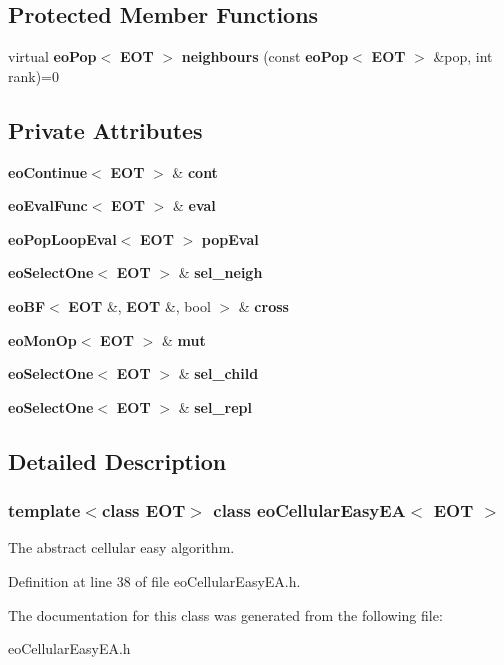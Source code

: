 \subsection*{Protected Member Functions}
\begin{CompactItemize}
\item 
virtual {\bf eo\-Pop}$<$ {\bf EOT} $>$ {\bf neighbours} (const {\bf eo\-Pop}$<$ {\bf EOT} $>$ \&pop, int rank)=0\label{classeo_cellular_easy_e_a_b0}

\end{CompactItemize}
\subsection*{Private Attributes}
\begin{CompactItemize}
\item 
{\bf eo\-Continue}$<$ {\bf EOT} $>$ \& {\bf cont}\label{classeo_cellular_easy_e_a_r0}

\item 
{\bf eo\-Eval\-Func}$<$ {\bf EOT} $>$ \& {\bf eval}\label{classeo_cellular_easy_e_a_r1}

\item 
{\bf eo\-Pop\-Loop\-Eval}$<$ {\bf EOT} $>$ {\bf pop\-Eval}\label{classeo_cellular_easy_e_a_r2}

\item 
{\bf eo\-Select\-One}$<$ {\bf EOT} $>$ \& {\bf sel\_\-neigh}\label{classeo_cellular_easy_e_a_r3}

\item 
{\bf eo\-BF}$<$ {\bf EOT} \&, {\bf EOT} \&, bool $>$ \& {\bf cross}\label{classeo_cellular_easy_e_a_r4}

\item 
{\bf eo\-Mon\-Op}$<$ {\bf EOT} $>$ \& {\bf mut}\label{classeo_cellular_easy_e_a_r5}

\item 
{\bf eo\-Select\-One}$<$ {\bf EOT} $>$ \& {\bf sel\_\-child}\label{classeo_cellular_easy_e_a_r6}

\item 
{\bf eo\-Select\-One}$<$ {\bf EOT} $>$ \& {\bf sel\_\-repl}\label{classeo_cellular_easy_e_a_r7}

\end{CompactItemize}


\subsection{Detailed Description}
\subsubsection*{template$<$class EOT$>$ class eo\-Cellular\-Easy\-EA$<$ EOT $>$}

The abstract cellular easy algorithm. 



Definition at line 38 of file eo\-Cellular\-Easy\-EA.h.

The documentation for this class was generated from the following file:\begin{CompactItemize}
\item 
eo\-Cellular\-Easy\-EA.h\end{CompactItemize}
